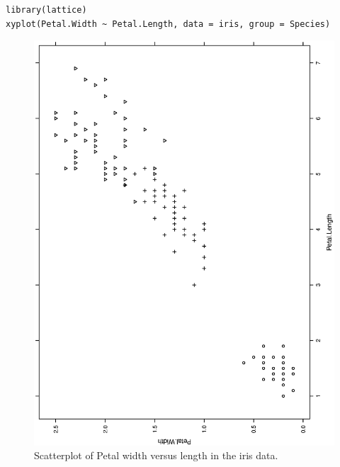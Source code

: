 \documentclass[captions=tableheading]{scrbook}
\begin{document}
\lstset{language=R}
\begin{lstlisting}
library(lattice)
xyplot(Petal.Width ~ Petal.Length, data = iris, group = Species)
\end{lstlisting}







\begin{figure}[th]
  \includegraphics[angle=270, totalheight=4in]{ps/datadesc/xyplot-group.ps}
  \caption[Scatterplot of Petal width versus length in the iris data.]{Scatterplot of Petal width versus length in the iris data.}
  \label{fig-xyplot-group}
\end{figure}
\end{document}
